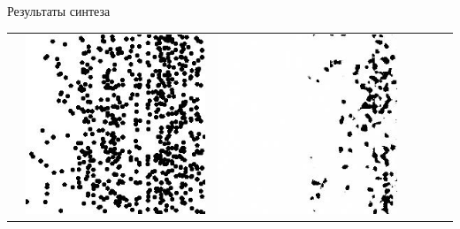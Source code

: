 \documentclass[12pt]{beamer}
\begin{document}
\begin{frame}{Результаты синтеза}
\begin{table}
\begin{center}
\begin{tabular}{p{1.2cm} p{1.2cm} p{1.2cm} p{1.2cm} p{1.2cm} p{1.2cm} p{1.2cm}}
					&
					\includegraphics[width=1\linewidth]{8-results/sand-trend2/pan1}
					&
					\includegraphics[width=1\linewidth]{8-results/sand-trend2/nf8/gen1}
					&

\end{tabular}
\end{center}
\end{table}
\end{frame}
\end{document}
